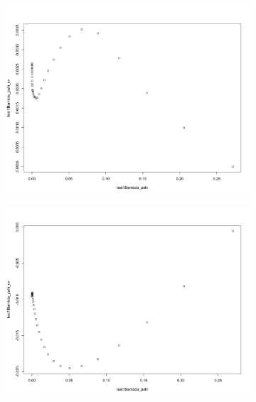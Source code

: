 \documentclass[letterpaper]{article}
\begin{document}
\begin{figure}[H]
\centering
\begin{subfigure}{0.5\textwidth}
  \centering
  \includegraphics[width=1\linewidth]{./result_plot/fix_k/5wrong_path_plot}
\end{subfigure}%
\begin{subfigure}{.5\textwidth}
  \centering
  \includegraphics[width=1\linewidth]{./result_plot/fix_k/6wrong_path_plot}
\end{subfigure}

\end{figure}
\end{document}
